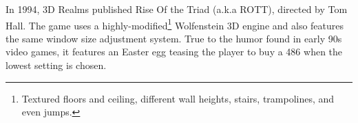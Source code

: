    \begin{figure}[H]
\centering
 \end{figure}
 \par

   \begin{figure}[H]
\centering
 \end{figure}
 \par
{} In 1994, 3D Realms published Rise Of the Triad (a.k.a ROTT), directed by Tom Hall. The game uses a highly-modified\footnote{Textured floors and ceiling, different wall heights, stairs, trampolines, and even jumps.} Wolfenstein 3D engine and also features the same window size adjustment system. True to the humor found in early 90s video games, it features an Easter egg teasing the player to buy a 486 when the lowest setting is chosen.
    \begin{figure}[H]
\centering
 \end{figure}
 \par
